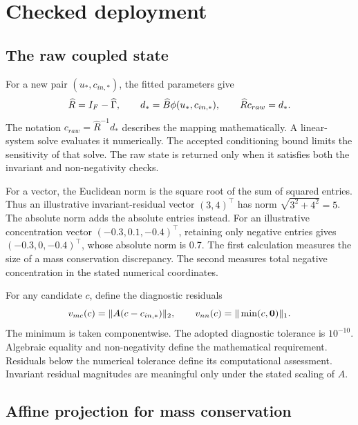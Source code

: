 \section{Checked deployment}

\subsection{The raw coupled state}

For a new pair \((u_*,c_{in,*})\), the fitted parameters give
\begin{equation}
\equationname{Raw deployed state from the fitted coupled system}
\label{eq:icsor_raw_state}
\widehat R=I_F-\widehat\Gamma,
\qquad d_* =\widehat B\phi(u_*,c_{in,*}),
\qquad \widehat R c_{raw}=d_*.
\end{equation}
The notation \(c_{raw}=\widehat R^{-1}d_*\) describes the mapping mathematically. A linear-system solve evaluates it numerically. The accepted conditioning bound limits the sensitivity of that solve. The raw state is returned only when it satisfies both the invariant and non-negativity checks.

For a vector, the Euclidean norm is the square root of the sum of squared entries. Thus an illustrative invariant-residual vector \((3,4)^\top\) has norm \(\sqrt{3^2+4^2}=5\). The absolute norm adds the absolute entries instead. For an illustrative concentration vector \((-0.3,0.1,-0.4)^\top\), retaining only negative entries gives \((-0.3,0,-0.4)^\top\), whose absolute norm is 0.7. The first calculation measures the size of a mass conservation discrepancy. The second measures total negative concentration in the stated numerical coordinates.

For any candidate \(c\), define the diagnostic residuals
\begin{equation}
\equationname{Mass conservation and non-negativity diagnostics of a deployed state}
\label{eq:icsor_deployment_diagnostics}
v_{mc}(c)=\|A(c-c_{in,*})\|_2,
\qquad
v_{nn}(c)=\|\min(c,\mathbf{0})\|_1.
\end{equation}
The minimum is taken componentwise. The adopted diagnostic tolerance is \(10^{-10}\). Algebraic equality and non-negativity define the mathematical requirement. Residuals below the numerical tolerance define its computational assessment. Invariant residual magnitudes are meaningful only under the stated scaling of \(A\).

\subsection{Affine projection for mass conservation}

